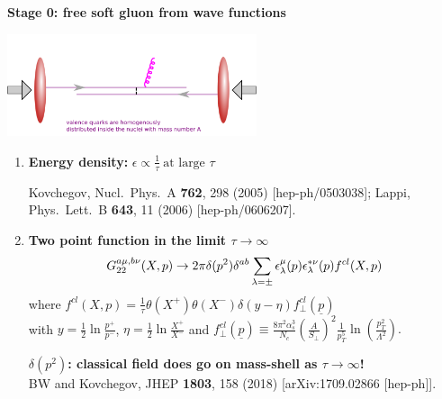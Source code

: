 \documentclass[9pt,a4paper,unknownkeysallowed,xcolor=dvipsnames,aspectratio=43]{beamer}
\begin{document}
\begin{frame}{\bf\huge Stage 0: free soft gluon from wave functions}
\begin{center}
\includegraphics[width=0.55\textwidth]{fig/classical}\\
\end{center}
\begin{enumerate}
\item{\large\bf Energy density:} $\epsilon\propto \frac{1}{\tau}~\text{at large $\tau$}$\\
\vspace{1mm}
\begin{center}
{\tiny  {\color{teablue}
  Kovchegov,
  Nucl.\ Phys.\ A {\bf 762}, 298 (2005)
  [hep-ph/0503038];
  Lappi,
  Phys.\ Lett.\ B {\bf 643}, 11 (2006)
  [hep-ph/0606207].
}}
\end{center}
\vspace{1mm}
\item{\large\bf Two point function in the limit $\tau\to\infty$}
\begin{align}
G_{22}^{a\mu,b\nu}(X, p) \to  2\pi\delta(p^2) \delta^{ab}
  \sum\limits_{\lambda=\pm}\epsilon_\lambda^\mu(p)
  \epsilon_{\lambda}^{*\nu}(p) f^{cl}(X,p)\notag
\end{align}
where $f^{cl}(X,p)=\frac{1}{\tau} \theta(X^+) \theta(X^-) \delta(y-\eta)
  f_\perp^{cl}(\underline{p})$\\
with $y = \frac{1}{2}\ln\frac{p^+}{p^-}$, $\eta = \frac{1}{2}\ln\frac{X^+}{X^-}$ and
$f_\perp^{cl}(\underline{p})\equiv\frac{8\pi^2\alpha_s^3}{N_c}\left(\frac{A}{S_\perp}\right)^2
  \frac{1}{p_T^5}\ln\left(\frac{p_T^2}{\Lambda^2}\right).$
  \vspace{1mm}

\begin{center}
  {\bf \color{darkred}\bf$\delta(p^2)$: classical field does go on mass-shell as $\tau\to\infty$!}\\
  \vspace{1mm}
  {\tiny  {\color{teablue}
  BW and Kovchegov,
  JHEP {\bf 1803}, 158 (2018)
  [arXiv:1709.02866 [hep-ph]].
}}
\end{center}
\end{enumerate}
\end{frame}
\end{document}
